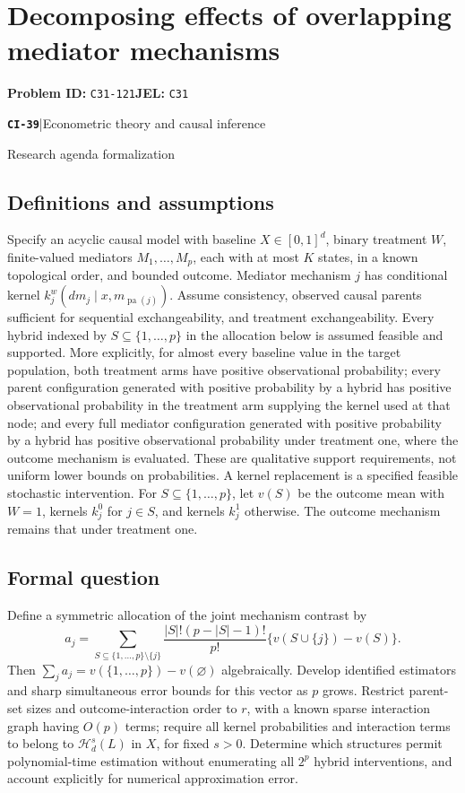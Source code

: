 \documentclass[11pt,a4paper]{article}
\newcommand{\entrymeta}[3]{{\sffamily\small\color{muted}\textbf{\texttt{#1}}\quad|\quad #2\par #3\par}}
\begin{document}
\section*{Decomposing effects of overlapping mediator mechanisms}
\textbf{Problem ID:} \texttt{C31-121}\quad \textbf{JEL:} \texttt{C31}\par
\label{problem:OP-0518}
\label{beyond:CI-39}
\entrymeta{CI-39}{Econometric theory and causal inference}{Research agenda formalization}
\subsection*{Definitions and assumptions}
Specify an acyclic causal model with baseline $X\in[0,1]^d$, binary treatment $W$, finite-valued mediators $M_1,\ldots,M_p$, each with at most $K$ states, in a known topological order, and bounded outcome. Mediator mechanism $j$ has conditional kernel $k_j^w(dm_j\mid x,m_{\operatorname{pa}(j)})$. Assume consistency, observed causal parents sufficient for sequential exchangeability, and treatment exchangeability. Every hybrid indexed by $S\subseteq\{1,\ldots,p\}$ in the allocation below is assumed feasible and supported. More explicitly, for almost every baseline value in the target population, both treatment arms have positive observational probability; every parent configuration generated with positive probability by a hybrid has positive observational probability in the treatment arm supplying the kernel used at that node; and every full mediator configuration generated with positive probability by a hybrid has positive observational probability under treatment one, where the outcome mechanism is evaluated. These are qualitative support requirements, not uniform lower bounds on probabilities. A kernel replacement is a specified feasible stochastic intervention. For $S\subseteq\{1,\ldots,p\}$, let $v(S)$ be the outcome mean with $W=1$, kernels $k_j^0$ for $j\in S$, and kernels $k_j^1$ otherwise. The outcome mechanism remains that under treatment one.
\subsection*{Formal question}
Define a symmetric allocation of the joint mechanism contrast by
\[
 a_j=\sum_{S\subseteq\{1,\ldots,p\}\setminus\{j\}}
 \frac{|S|!(p-|S|-1)!}{p!}\{v(S\cup\{j\})-v(S)\}.
\]
Then $\sum_ja_j=v(\{1,\ldots,p\})-v(\varnothing)$ algebraically. Develop identified estimators and sharp simultaneous error bounds for this vector as $p$ grows. Restrict parent-set sizes and outcome-interaction order to $r$, with a known sparse interaction graph having $O(p)$ terms; require all kernel probabilities and interaction terms to belong to $\mathcal H_d^s(L)$ in $X$, for fixed $s>0$. Determine which structures permit polynomial-time estimation without enumerating all $2^p$ hybrid interventions, and account explicitly for numerical approximation error.
\end{document}

